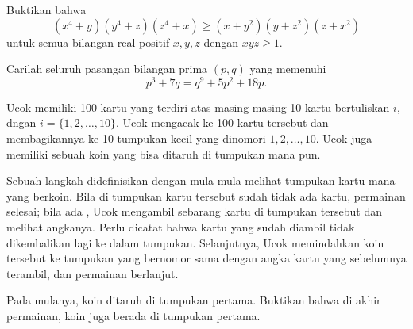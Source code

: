 \documentclass[11pt]{scrartcl}
\begin{document}
	\begin{soalbaru}
		Buktikan bahwa 
		\[ (x^4+y)(y^4+z)(z^4+x) \geq (x+y^2)(y+z^2)(z+x^2) \] untuk semua bilangan real positif $x, y, z$ dengan $xyz \geq 1$.
	\end{soalbaru}

	\begin{soalbaru}
		Carilah seluruh pasangan bilangan prima $(p, q)$ yang memenuhi
		\[ p^3+7q=q^9+5p^2+18p. \]
	\end{soalbaru}

	
	\begin{soalbaru}
	Ucok memiliki 100 kartu yang terdiri atas masing-masing 10 kartu bertuliskan $i$, dngan $i=\{1,2,\dots,10\}$. Ucok mengacak ke-100 kartu tersebut dan membagikannya ke 10 tumpukan kecil yang dinomori $1,2,\dots, 10$. Ucok juga memiliki sebuah koin yang bisa ditaruh di tumpukan mana pun.
	
	Sebuah langkah didefinisikan dengan mula-mula melihat tumpukan kartu mana yang berkoin. Bila di tumpukan kartu tersebut sudah tidak ada kartu, permainan selesai; bila ada , Ucok mengambil sebarang kartu di tumpukan tersebut dan melihat angkanya. Perlu dicatat bahwa kartu yang sudah diambil tidak dikembalikan lagi ke dalam tumpukan. Selanjutnya, Ucok memindahkan koin tersebut ke tumpukan yang bernomor sama dengan angka kartu yang sebelumnya terambil, dan permainan berlanjut.
	
	Pada mulanya, koin ditaruh di tumpukan pertama. Buktikan bahwa di akhir permainan, koin juga berada di tumpukan pertama.
	\end{soalbaru}


	
\end{document}
